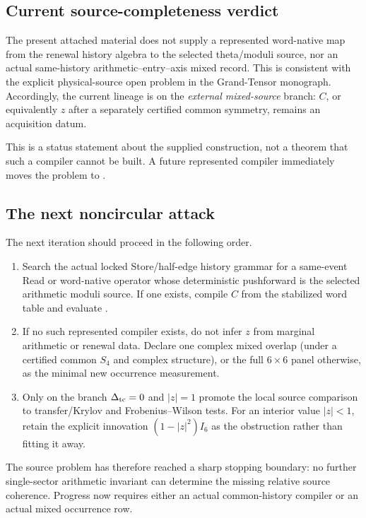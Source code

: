 \documentclass[11pt]{article}
\theoremstyle{definition}
\theoremstyle{remark}
\begin{document}
\subsection{Current source-completeness verdict}
The present attached material does not supply a represented word-native map
from the renewal history algebra to the selected theta/moduli source, nor an
actual same-history arithmetic--entry--axis mixed record.  This is consistent
with the explicit physical-source open problem in the Grand-Tensor monograph.
Accordingly, the current lineage is on the \emph{external mixed-source}
branch: $C$, or equivalently $z$ after a separately certified common symmetry,
remains an acquisition datum.

This is a status statement about the supplied construction, not a theorem that
such a compiler cannot be built.  A future represented compiler immediately
moves the problem to .

\subsection{The next noncircular attack}
The next iteration should proceed in the following order.
\begin{enumerate}[label=\textup{(N\arabic*)},leftmargin=3em]
\item Search the actual locked Store/half-edge history grammar for a same-event
      Read or word-native operator whose deterministic pushforward is the
      selected arithmetic moduli source.  If one exists, compile $C$ from the
      stabilized word table and evaluate .
\item If no such represented compiler exists, do not infer $z$ from marginal
      arithmetic or renewal data.  Declare one complex mixed overlap (under a
      certified common $S_4$ and complex structure), or the full $6\times6$
      panel otherwise, as the minimal new occurrence measurement.
\item Only on the branch $\Delta_{\rm tc}=0$ and $|z|=1$ promote the local
      source comparison to transfer/Krylov and Frobenius--Wilson tests.  For an
      interior value $|z|<1$, retain the explicit innovation
      $(1-|z|^2)I_6$ as the obstruction rather than fitting it away.
\end{enumerate}

The source problem has therefore reached a sharp stopping boundary: no further
single-sector arithmetic invariant can determine the missing relative source
coherence.  Progress now requires either an actual common-history compiler or
an actual mixed occurrence row.
\end{document}

